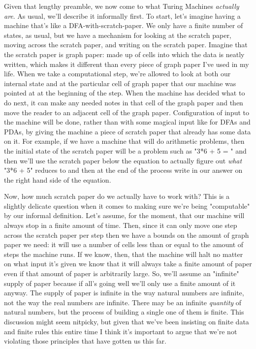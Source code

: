 \documentclass[11pt]{article}
\begin{document}
Given that lengthy preamble, we now come to what Turing Machines \emph{actually are}. As usual, we'll describe it informally first. To start, let's imagine having a machine that's like a DFA-with-scratch-paper. We only have a finite number of states, as usual, but we have a mechanism for looking at the scratch paper, moving across the scratch paper, and writing on the scratch paper. Imagine that the scratch paper is graph paper: made up of cells into which the data is neatly written, which makes it different than every piece of graph paper I've used in my life. When we take a computational step, we're allowed to look at both our internal state and at the particular cell of graph paper that our machine was pointed at at the beginning of the step. When the machine has decided what to do next, it can make any needed notes in that cell of the graph paper and then move the reader to an adjacent cell of the graph paper. Configuration of input to the machine will be done, rather than with some magical input like for DFAs and PDAs, by giving the machine a piece of scratch paper that already has some data on it. For example, if we have a machine that will do arithmetic problems, then the initial state of the scratch paper will be a problem such as "3*6 + 5 = " and then we'll use the scratch paper below the equation to actually figure out \emph{what} "3*6 + 5" reduces to and then at the end of the process write in our answer on the right hand side of the equation.

Now, how much scratch paper do we actually have to work with? This is a slightly delicate question when it comes to making sure we're being "computable" by our informal definition. Let's assume, for the moment, that our machine will always stop in a finite amount of time. Then, since it can only move one step across the scratch paper per step then we have a bounds on the amount of graph paper we need: it will use a number of cells less than or equal to the amount of steps the machine runs. If we know, then, that the machine will halt no matter on what input it's given we know that it will always take a finite amount of paper even if that amount of paper is arbitrarily large. So, we'll assume an "infinite" supply of paper because if all's going well we'll only use a finite amount of it anyway. The supply of paper is infinite in the way natural numbers are infinite, not the way the real numbers are infinite. There may be an infinite \emph{quantity} of natural numbers, but the process of building a single one of them is finite. This discussion might seem nitpicky, but given that we've been insisting on finite data and finite rules this entire time I think it's important to argue that we're not violating those principles that have gotten us this far. 
\end{document}
